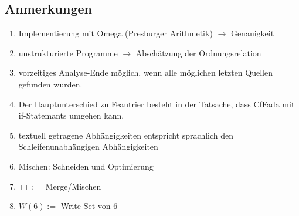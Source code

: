 \subsection{Anmerkungen}
\begin{enumerate}
  \item Implementierung mit Omega (Presburger Arithmetik) \( \rightarrow \) Genauigkeit
  \item unstrukturierte Programme \( \rightarrow \) Abschätzung der Ordnungsrelation
  \item vorzeitiges Analyse-Ende möglich, wenn alle möglichen letzten Quellen gefunden wurden.
  \item Der Hauptunterschied zu Feautrier besteht in der Tatsache, dass CfFada mit if-Statemants umgehen kann.
  \item textuell getragene Abhängigkeiten entspricht sprachlich den Schleifenunabhängigen Abhängigkeiten
  \item Mischen: Schneiden und Optimierung
  \item \( \Box := \) Merge/Mischen
  \item \( W(6) := \) Write-Set von 6
\end{enumerate}



